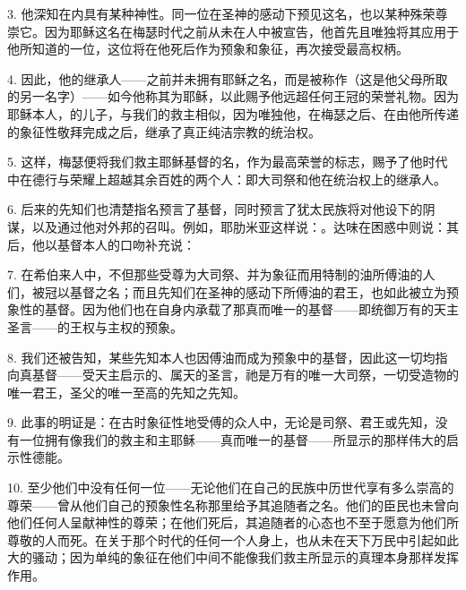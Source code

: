 3. 他深知在内具有某种神性。同一位在圣神的感动下预见这名，也以某种殊荣尊崇它。因为耶稣这名在梅瑟时代之前从未在人中被宣告，他首先且唯独将其应用于他所知道的一位，这位将在他死后作为预象和象征，再次接受最高权柄。\par

4. 因此，他的继承人——之前并未拥有耶稣之名，而是被称作（这是他父母所取的另一名字）——如今他称其为耶稣，以此赐予他远超任何王冠的荣誉礼物。因为耶稣本人，的儿子，与我们的救主相似，因为唯独他，在梅瑟之后、在由他所传递的象征性敬拜完成之后，继承了真正纯洁宗教的统治权。\par

5. 这样，梅瑟便将我们救主耶稣基督的名，作为最高荣誉的标志，赐予了他时代中在德行与荣耀上超越其余百姓的两个人：即大司祭和他在统治权上的继承人。\par

6. 后来的先知们也清楚指名预言了基督，同时预言了犹太民族将对他设下的阴谋，以及通过他对外邦的召叫。例如，耶肋米亚这样说：。达味在困惑中则说：其后，他以基督本人的口吻补充说：\par

7. 在希伯来人中，不但那些受尊为大司祭、并为象征而用特制的油所傅油的人们，被冠以基督之名；而且先知们在圣神的感动下所傅油的君王，也如此被立为预象性的基督。因为他们也在自身内承载了那真而唯一的基督——即统御万有的天主圣言——的王权与主权的预象。\par

8. 我们还被告知，某些先知本人也因傅油而成为预象中的基督，因此这一切均指向真基督——受天主启示的、属天的圣言，祂是万有的唯一大司祭，一切受造物的唯一君王，圣父的唯一至高的先知之先知。\par

9. 此事的明证是：在古时象征性地受傅的众人中，无论是司祭、君王或先知，没有一位拥有像我们的救主和主耶稣——真而唯一的基督——所显示的那样伟大的启示性德能。\par

10. 至少他们中没有任何一位——无论他们在自己的民族中历世代享有多么崇高的尊荣——曾从他们自己的预象性名称那里给予其追随者之名。他们的臣民也未曾向他们任何人呈献神性的尊荣；在他们死后，其追随者的心态也不至于愿意为他们所尊敬的人而死。在关于那个时代的任何一个人身上，也从未在天下万民中引起如此大的骚动；因为单纯的象征在他们中间不能像我们救主所显示的真理本身那样发挥作用。\par

